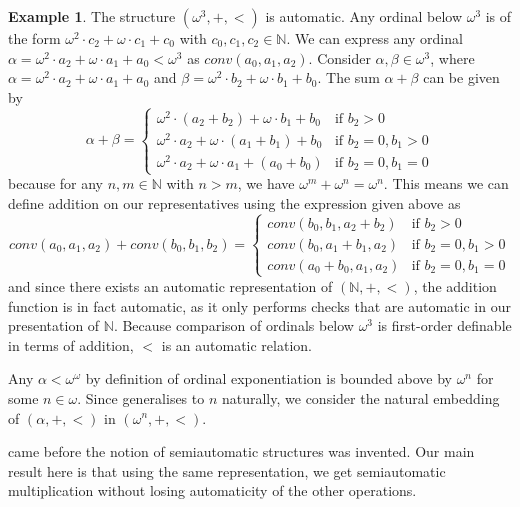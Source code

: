\documentclass[british,a4paper,11pt,abstract=on]{scrreprt}
\theoremstyle{definition}
\newtheorem{example}[theorem]{Example}
\theoremstyle{remark}
\newcommand{\N}{\mathbb{N}}
\begin{document}
\begin{example} \label{omega^3 is automatic}
    The structure \((\omega^3, +, <)\) is automatic. Any ordinal below \(\omega^3\) is of the form
    \(\omega^2\cdot c_2 + \omega\cdot c_1 + c_0\) with \(c_0,c_1,c_2 \in \N\).
    We can express any ordinal \(\alpha = \omega^2\cdot a_2 + \omega\cdot a_1 + a_0 < \omega^3\) as \(conv(a_0, a_1, a_2)\).
    Consider \(\alpha,\beta \in \omega^3\), where
    \(\alpha = \omega^2\cdot a_2 + \omega\cdot a_1 + a_0\) and
    \(\beta = \omega^2\cdot b_2 + \omega\cdot b_1 + b_0\).
    The sum \(\alpha + \beta\) can be given by
    \[
        \alpha + \beta = \begin{cases}
            \omega^2\cdot(a_2 + b_2) + \omega\cdot b_1 + b_0 &\text{if } b_2>0\\
            \omega^2\cdot a_2 + \omega\cdot(a_1 + b_1) + b_0 &\text{if } b_2=0, b_1>0\\
            \omega^2\cdot a_2 + \omega\cdot a_1 + (a_0 + b_0) &\text{if } b_2=0, b_1=0
        \end{cases}
    \]
    because for any \(n,m\in\N\) with \(n>m\), we have \(\omega^m + \omega^n = \omega^{n}\).
    This means we can define addition on our representatives using the expression given above as
    \[
        conv(a_0,a_1,a_2) + conv(b_0,b_1,b_2) = \begin{cases}
            conv(b_0, b_1, a_2 + b_2)
            &\text{if } b_2>0\\
            conv(b_0, a_1+b_1, a_2)
            &\text{if } b_2=0, b_1>0\\
            conv(a_0+b_0, a_1, a_2)
            &\text{if } b_2=0, b_1=0
        \end{cases}
    \]
    and since there exists an automatic representation of \((\N, +, <)\),
    the addition function is in fact automatic,
    as it only performs checks that are automatic in our presentation of \(\N\).
    Because comparison of ordinals below \(\omega^3\) is first-order definable in terms of addition, \(<\) is an automatic relation.
\end{example}

Any \(\alpha < \omega^\omega\) by definition of ordinal exponentiation is bounded above by \(\omega^n\) for some \(n \in \omega\).
Since  generalises to \(n\) naturally, we consider the natural embedding of \((\alpha, +, <)\) in \((\omega^n, +, <)\).

 came before the notion of semiautomatic structures was invented.
Our main result here is that using the same representation, we get semiautomatic multiplication without losing automaticity of the other operations.
\end{document}
